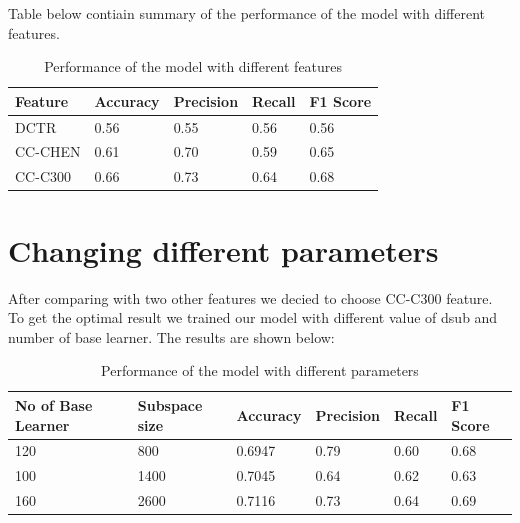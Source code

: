 \begin{flushleft}
Table below contiain summary of the performance of the model with different features.
\end{flushleft}
\begin{table}[H]
    \centering
    \begin{tabular}{|l|l|l|l|l|}
    \hline
    Feature & Accuracy & Precision & Recall & F1 Score \\ \hline
    DCTR    & 0.56   & 0.55    & 0.56 & 0.56  \\ \hline
    CC-CHEN & 0.61     & 0.70      & 0.59   & 0.65     \\ \hline
    CC-C300 & 0.66     & 0.73      & 0.64   & 0.68     \\ \hline
    \end{tabular}
    \caption{Performance of the model with different features}
\end{table}
\section{Changing different parameters}
After comparing with two other features we decied to choose CC-C300 feature. To get the optimal result we trained our model with different value of dsub and number of base learner. The results are shown below:
\begin{table}[H]
    \centering
    \begin{tabular}{|l|l|l|l|l|l|}
    \hline
    No of  Base Learner & Subspace size & Accuracy & Precision & Recall &F1 Score \\ \hline
    120                 & 800           & 0.6947   &    0.79       &  0.60&  0.68    \\ \hline
    100                 & 1400         & 0.7045   &    0.64       &   0.62 & 0.63   \\ \hline
    160                 & 2600         & 0.7116   &    0.73       &    0.64 & 0.69  \\ \hline
    \end{tabular}
    \caption{Performance of the model with different parameters}
\end{table}

